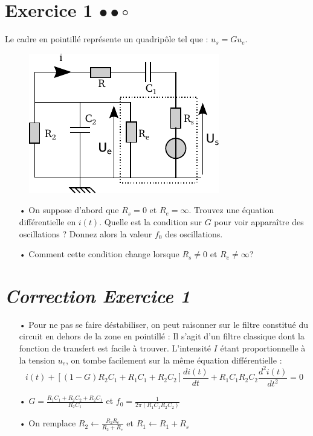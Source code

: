 \documentclass{report}
\begin{document}
\section*{Exercice 1 $\bullet\bullet\circ$}

Le cadre en pointillé représente un quadripôle tel que : $u_{s}=Gu_{e}$.

\begin{figure}[!h]
\centering
\includegraphics[width=0.5\linewidth]{circuit_5.pdf}
\end{figure}

\begin{itemize}

\item[•] On suppose d'abord que $R_{s}=0$ et $R_{e}=\infty$. Trouvez  une équation différentielle en $i(t)$. Quelle est la condition sur $G$ pour voir apparaître des oscillations ? Donnez alors la valeur $f_0$ des oscillations.

\item[•] Comment cette condition change lorsque $R_{s}\neq 0$ et $R_{e}\neq\infty$?

\end{itemize}

\newpage

\section*{\textit{Correction Exercice 1}}

\begin{itemize}
	\item[•] Pour ne pas se faire déstabiliser, on peut raisonner sur le filtre constitué du circuit en dehors de la zone en pointillé : Il s'agit d'un filtre classique dont la fonction de transfert est facile à trouver. L'intensité $I$ étant proportionnelle à la tension $u_e$, on tombe facilement sur la même équation différentielle :
	\begin{equation}
		i(t) + \left[(1-G)R_2C_1 +R_1C_1+R_2C_2\right]\frac{di(t)}{dt}+R_1C_1R_2C_2\frac{d^2i(t)}{dt^2}=0 
	\end{equation}
	\item[•]  $G=\frac{R_1C_1+R_2C_2+R_2C_1}{R_2C_1}$ et $f_0=\frac{1}{2\pi(R_1C_1R_2C_2)}$
	\item[•] On remplace $R_2\leftarrow\frac{R_2R_e}{R_2+R_e}$ et $R_1\leftarrow R_1+R_s$
\end{itemize}
\end{document}
